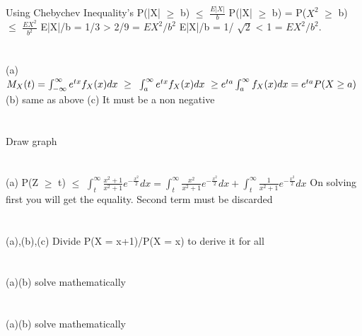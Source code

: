 \documentclass{report}
\begin{document}
\section{}
Using Chebychev Inequality's \newline
P(|X| $\ge$ b) $\le$ $\frac{E|X|}{b}$
\newline
P(|X| $\ge$ b) = P($X^{2}$ $\ge$ b) $\le$ $\frac{EX^2}{b^2}$
\newline
E|X|/b = 1/3 > 2/9 = $EX^2/b^2$
\newline
E|X|/b = 1/ $\sqrt{2}$ < 1 = $EX^2/b^2$.
\newline

\section{}
(a) $M_X(t) = \int_{-\infty}^{\infty}e^{tx}f_X(x)dx \text{ } \ge \text{ } \newline \int_{a}^{\infty}e^{tx}f_X(x)dx \text{ } \ge e^{ta} \int_{a}^{\infty}f_X(x)dx = e^{ta}P(X \ge a)$
\newline
(b) same as above
\newline
(c) It must be a non negative
\newline

\section{}
Draw graph
\newline

\section{}
(a) P(Z $\ge$ t) $\le$ $\int_{t}^{\infty}\frac{x^2 + 1}{x^2 + 1}e^{-\frac{x^2}{2}}dx = \int_{t}^{\infty}\frac{x^2}{x^2 + 1}e^{-\frac{x^2}{2}}dx + \int_{t}^{\infty}\frac{1}{x^2 + 1}e^{-\frac{x^2}{2}}dx$
\newline
On solving first you will get the equality. Second term must be discarded
\newline

\section{}
(a),(b),(c) Divide P(X = x+1)/P(X = x) to derive it for all
\newline

\section{}
(a)(b) solve mathematically
\newline

\section{}
(a)(b) solve mathematically
\newline


		
\end{document}
